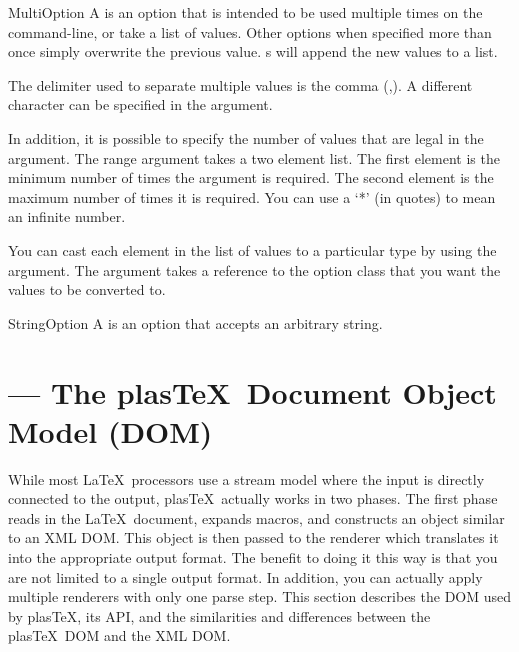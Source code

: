 \documentclass{manual}
\newcommand{\plasTeX}{plas\TeX}
\begin{document}
\begin{classdesc}{MultiOption}{}
A  is an option that is intended to be used multiple times
on the command-line, or take a list of values.  Other options when specified
more than once simply overwrite the previous value.  s
will append the new values to a list.

The delimiter used to separate multiple values is the comma (,).  A different
character can be specified in the  argument.  

In addition, it is possible to specify the number of values that are legal
in the  argument.  The range argument takes a two element list.
The first element is the minimum number of times the argument is required.
The second element is the maximum number of times it is required.  You can
use a `*' (in quotes) to mean an infinite number.

You can cast each element in the list of values to a particular type by
using the  argument.  The  argument takes a
reference to the option class that you want the values to be converted to.
\end{classdesc}

\begin{classdesc}{StringOption}{}
A  is an option that accepts an arbitrary string.
\end{classdesc}


\section{ --- The \plasTeX\ Document Object Model (DOM)}

\modulesynopsis{The Document Object Model (DOM) used by \plasTeX.}

While most \LaTeX\ processors use a stream model where the input is 
directly connected to the output, \plasTeX\ actually works in two phases.
The first phase reads in the \LaTeX\ document, expands macros, and
constructs an object similar to an XML DOM.  This object is then passed
to the renderer which translates it into the appropriate output format.
The benefit to doing it this way is that you are not limited to a single
output format.  In addition, you can actually apply multiple renderers
with only one parse step.  This section describes the DOM used by 
\plasTeX, its API, and the similarities and differences between the 
\plasTeX\ DOM and the XML DOM.
\end{document}
